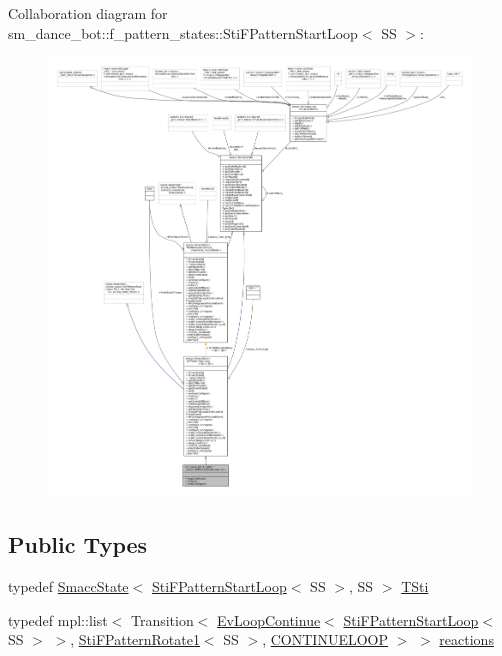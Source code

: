 Collaboration diagram for sm\+\_\+dance\+\_\+bot\+:\+:f\+\_\+pattern\+\_\+states\+:\+:Sti\+F\+Pattern\+Start\+Loop$<$ SS $>$\+:
\nopagebreak
\begin{figure}[H]
\begin{center}
\leavevmode
\includegraphics[width=350pt]{structsm__dance__bot_1_1f__pattern__states_1_1StiFPatternStartLoop__coll__graph}
\end{center}
\end{figure}
\subsection*{Public Types}
\begin{DoxyCompactItemize}
\item 
typedef \hyperlink{classSmaccState}{Smacc\+State}$<$ \hyperlink{structsm__dance__bot_1_1f__pattern__states_1_1StiFPatternStartLoop}{Sti\+F\+Pattern\+Start\+Loop}$<$ SS $>$, SS $>$ \hyperlink{structsm__dance__bot_1_1f__pattern__states_1_1StiFPatternStartLoop_a18f1bcdd4f45d9230c9b23b6153ae9e2}{T\+Sti}
\item 
typedef mpl\+::list$<$ Transition$<$ \hyperlink{structsmacc_1_1default__events_1_1EvLoopContinue}{Ev\+Loop\+Continue}$<$ \hyperlink{structsm__dance__bot_1_1f__pattern__states_1_1StiFPatternStartLoop}{Sti\+F\+Pattern\+Start\+Loop}$<$ SS $>$ $>$, \hyperlink{structsm__dance__bot_1_1f__pattern__states_1_1StiFPatternRotate1}{Sti\+F\+Pattern\+Rotate1}$<$ SS $>$, \hyperlink{structsmacc_1_1default__transition__tags_1_1CONTINUELOOP}{C\+O\+N\+T\+I\+N\+U\+E\+L\+O\+OP} $>$ $>$ \hyperlink{structsm__dance__bot_1_1f__pattern__states_1_1StiFPatternStartLoop_ab410fb656e621c3ce2ee7bb0bb11eae2}{reactions}
\end{DoxyCompactItemize}
